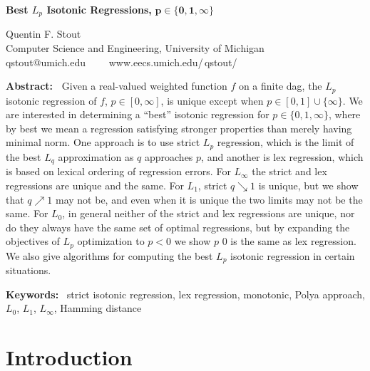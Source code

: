 \documentclass[11pt]{article}
\begin{document}
    
 
\begin{center}
{\Large \textbf{Best $L_p$ Isotonic Regressions,} $\mathbf{p \in \{0, 1, \infty\}}$}
\bigskip

{\large Quentin F. Stout}\\[\medskipamount]
Computer Science and Engineering, University of Michigan\\
qstout@umich.edu~~~~
www.eecs.umich.edu/{\,\raisebox{-0.5ex}{\textasciitilde}qstout/}

\end{center}
\bigskip

  
\noindent \textbf{Abstract:~}
Given a real-valued weighted function $f$ on a finite dag, the $L_p$ isotonic regression of $f$, $p \in [0,\infty]$, 
is unique except when $p \in [0,1] \cup \{\infty\}$.
We are interested in determining a ``best'' isotonic regression for $p \in \{0, 1, \infty\}$, where by best we mean a regression satisfying stronger properties than merely having minimal norm.
One approach is to use strict $L_p$ regression, which is the limit of the best $L_q$ approximation as $q$ approaches $p$, and another is lex regression, which is based on lexical ordering of regression errors.
For $L_\infty$ the strict and lex regressions are unique and the same.
For $L_1$, strict $q \scriptstyle\searrow 1$ is unique, but we show that $q \scriptstyle\nearrow 1$ may not be,
and even when it is unique the two limits may not be the same.
For $L_0$, in general neither of the strict and lex regressions are unique, nor do they always have the same set of optimal regressions, but by expanding the objectives of $L_p$ optimization to $p < 0$ we show $p$ {\scalebox{0.7}{$\nearrow$}} $0$ is the same as lex regression.
We also give algorithms for computing the best $L_p$ isotonic regression in certain situations.
\medskip 

\noindent \textbf{Keywords:}~  strict isotonic regression, lex regression, monotonic, Polya approach, $L_0$, $L_1$, $L_\infty$, Hamming distance
\bigskip


\section{Introduction} \label{sec:Intro}
\end{document}
